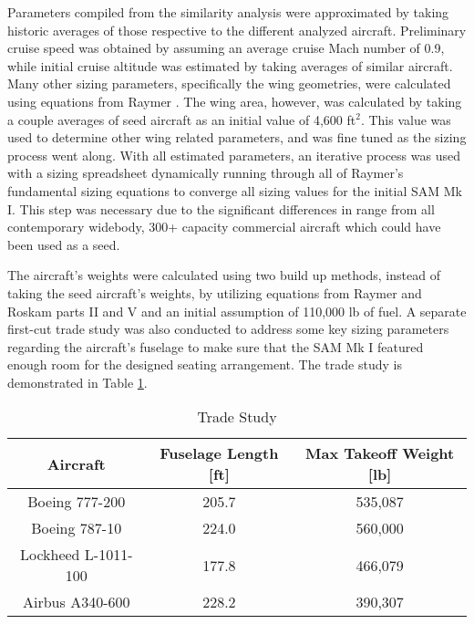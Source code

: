 Parameters compiled from the similarity analysis were approximated by taking historic averages of those respective to the different analyzed aircraft. Preliminary cruise speed was obtained by assuming an average cruise Mach number of 0.9, while initial cruise altitude was estimated by taking averages of similar aircraft. Many other sizing parameters, specifically the wing geometries, were calculated using equations from Raymer \cite{raymer}. The wing area, however, was calculated by taking a couple averages of seed aircraft as an initial value of 4,600 ft$^2$. This value was used to determine other wing related parameters, and was fine tuned as the sizing process went along. With all estimated parameters, an iterative process was used with a sizing spreadsheet dynamically running through all of Raymer's \cite{raymer} fundamental sizing equations to converge all sizing values for the initial SAM Mk I. This step was necessary due to the significant differences in range from all contemporary widebody, 300+ capacity commercial aircraft which could have been used as a seed.

\clearpage
The aircraft's weights were calculated using two build up methods, instead of taking the seed aircraft's weights, by utilizing equations from Raymer \cite{raymer} and Roskam parts II \cite{roskam_2} and V \cite{roskam_5} and an initial assumption of 110,000 lb of fuel. A separate first-cut trade study was also conducted to address some key sizing parameters regarding the aircraft's fuselage to make sure that the SAM Mk I featured enough room for the designed seating arrangement. The trade study is demonstrated in Table \ref{tab:trade_params}.

\begin{table}[!h] 
    \centering
    \caption{Trade Study}
    \begin{tabular}{ |c||c||c| }\toprule
    \textbf{Aircraft} & \textbf{Fuselage Length [ft]} & \textbf{Max Takeoff Weight [lb]} \\\hline\hline
    Boeing 777-200 & 205.7 & 535,087  \\\hline
    Boeing 787-10 & 224.0 & 560,000  \\\hline
    Lockheed L-1011-100 & 177.8 & 466,079  \\\hline
    Airbus A340-600 & 228.2 & 390,307  \\\hline

    \end{tabular}\label{tab:trade_params}
\end{table}

